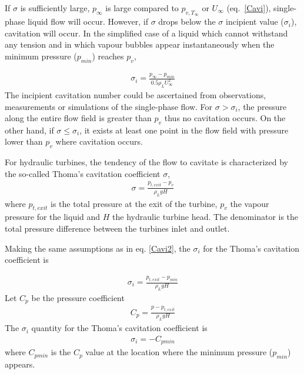 If $\sigma$ is sufficiently large, $p_{\infty}$ is large compared to $p_{v,T_{\infty}}$ or $U_{\infty}$ (eq.\ \ref{Cavi}), single-phase liquid flow will occur. However, if $\sigma$ drops below the $\sigma$ incipient value ($\sigma_i$), cavitation will occur. In the simplified case of a liquid which cannot withstand any tension and in which vapour bubbles appear instantaneously when the minimum pressure ($p_{min}$) reaches $p_{v}$,

\begin{eqnarray}
		\sigma_i=\frac{p_{\infty}-p_{min}}{0.5\rho_{L}U^2_{\infty}}
\label{Cavi2}
\end{eqnarray}
The incipient cavitation number could be ascertained from observations, measurements or simulations of the single-phase flow. For $\sigma > \sigma_i$, the pressure along the entire flow field is greater than $p_v$ thus no cavitation occurs. On the other hand, if $\sigma \leq \sigma_i$, it exists at least one point in the flow field with pressure lower than $p_v$ where cavitation occurs. 


For hydraulic turbines, the tendency of the flow to cavitate is characterized by the so-called Thoma's cavitation coefficient $\sigma$, \cite{brennen1995cavitation}  
\begin{eqnarray}
		\sigma=\frac{p_{t,exit}-p_{v}}{\rho_{L}gH}
\label{Cavi3}
\end{eqnarray}
where $p_{t,exit}$ is the total pressure at the exit of the turbine, $p_v$ the vapour pressure for the liquid and $H$ the hydraulic turbine head. The denominator is the total pressure difference between the turbines inlet and outlet.   

Making the same assumptions as in eq. \ref{Cavi2}, the $\sigma_i$ for the Thoma's cavitation coefficient  is 

\begin{eqnarray}
		\sigma_i=\frac{p_{t,exit}-p_{min}}{\rho_{L}gH}
\label{Cavi4}
\end{eqnarray}
Let $C_p$ be the pressure coefficient 
\begin{eqnarray}
		C_p=\frac{p-p_{t,exit}}{\rho_{L}gH}
\label{Cpdef}
\end{eqnarray}
The $\sigma_i$ quantity for the Thoma's cavitation coefficient is 
\begin{eqnarray}
		\sigma_i=-C_{pmin}
\label{Cavi6}
\end{eqnarray}
where $C_{pmin}$ is the $C_p$ value at the location where the minimum pressure ($p_{min}$) appears.

